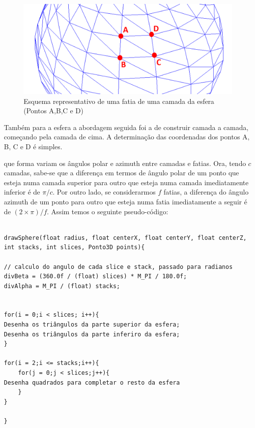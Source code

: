 \begin{figure}[<+htpb+>]
	\centering
	\includegraphics[scale=0.5]{imagens/p3_esferaSeccao_edit.png}
	\caption{Esquema representativo de uma fatia de uma camada da esfera (Pontos A,B,C e D)}
	\label{p1:fig:p3_esferaSeccao_edit}
\end{figure}

Também para a esfera a abordagem seguida foi a de construir camada a camada, começando pela camada de cima. A determinação das coordenadas dos pontos A, B, C e D é simples. 



que forma variam os ângulos polar e azimuth entre camadas e fatias. Ora, tendo $c$ camadas, sabe-se que a diferença em termos de ângulo polar de um ponto que esteja numa camada superior para outro que esteja numa camada imediatamente inferior é de $\pi / c$. Por outro lado, se considerarmos $f$ fatias, a diferença do ângulo azimuth de um ponto para outro que esteja numa fatia imediatamente a seguir é de $(2 \times \pi) / f$. Assim temos o seguinte pseudo-código:

\begin{Verbatim}

drawSphere(float radius, float centerX, float centerY, float centerZ, int stacks, int slices, Ponto3D points){

// calculo do angulo de cada slice e stack, passado para radianos
divBeta = (360.0f / (float) slices) * M_PI / 180.0f;
divAlpha = M_PI / (float) stacks;  


for(i = 0;i < slices; i++){
Desenha os triângulos da parte superior da esfera;
Desenha os triângulos da parte inferiro da esfera;
}

for(i = 2;i <= stacks;i++){
	for(j = 0;j < slices;j++){
Desenha quadrados para completar o resto da esfera
	}
}

}

\end{Verbatim}


